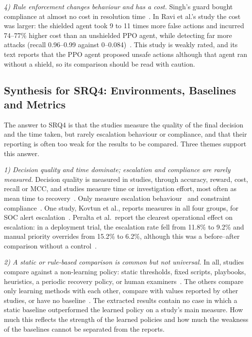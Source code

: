 \emph{4) Rule enforcement changes behaviour and has a cost.} Singh's guard bought compliance at almost no cost in resolution time~\cite{singh2026}. In Ravi et al.'s study the cost was larger: the shielded agent took 9 to 11 times more false actions and incurred 74--77\% higher cost than an unshielded PPO agent, while detecting far more attacks (recall 0.96--0.99 against 0--0.084)~\cite{ravi2025}. This study is weakly rated, and its text reports that the PPO agent proposed unsafe actions although that agent ran without a shield, so its comparison should be read with caution.

\subsection{Synthesis for SRQ4: Environments, Baselines and Metrics}

The answer to SRQ4 is that the studies measure the quality of the final decision and the time taken, but rarely escalation behaviour or compliance, and that their reporting is often too weak for the results to be compared. Three themes support this answer.

\emph{1) Decision quality and time dominate; escalation and compliance are rarely measured.} Decision quality is measured in \NDQ{} studies, through accuracy, reward, cost, recall or MCC, and \NEff{} studies measure time or investigation effort, most often as mean time to recovery~\cite{singh2026,koupaei2026,nimmathi2026,aenugu2026}. Only \NEscM{} measure escalation behaviour~\cite{peralta2025,sahin2026,nimmathi2026,bhosale2026,kovtun2026} and \NComp{} constraint compliance~\cite{singh2026,sahin2026,kovtun2026,ravi2025}. One study, Kovtun et al., reports measures in all four groups, for SOC alert escalation~\cite{kovtun2026}. Peralta et al.\ report the clearest operational effect on escalation: in a deployment trial, the escalation rate fell from 11.8\% to 9.2\% and manual priority overrides from 15.2\% to 6.2\%, although this was a before--after comparison without a control~\cite{peralta2025}.

\emph{2) A static or rule-based comparison is common but not universal.} In all, \NRuleBase{} studies compare against a non-learning policy: static thresholds, fixed scripts, playbooks, heuristics, a periodic recovery policy, or human examiners~\cite{hammar2026belief,koupaei2026,bhosale2026,wu2026,yuan2026,aenugu2026,ghanem2026}. The others compare only learning methods with each other, compare with values reported by other studies, or have no baseline~\cite{saeed2025,noorulhassan2026,khozam2025,elicha2026,hughes2022,jaber2025,alturkistani2022}. The extracted results contain no case in which a static baseline outperformed the learned policy on a study's main measure. How much this reflects the strength of the learned policies and how much the weakness of the baselines cannot be separated from the reports.

